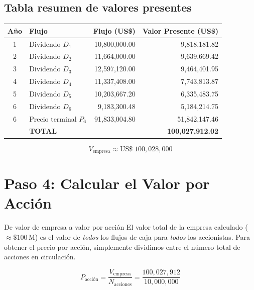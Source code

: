 \documentclass[12pt,a4paper]{article}
\begin{document}
\subsection*{Tabla resumen de valores presentes}

\begin{center}
\begin{tabular}{clrr}
\toprule
\textbf{A\~no} & \textbf{Flujo} & \textbf{Flujo (US\$)} & \textbf{Valor Presente (US\$)} \\
\midrule
1 & Dividendo $D_1$  & 10{,}800{,}000.00  &  9{,}818{,}181.82 \\
2 & Dividendo $D_2$  & 11{,}664{,}000.00  &  9{,}639{,}669.42 \\
3 & Dividendo $D_3$  & 12{,}597{,}120.00  &  9{,}464{,}401.95 \\
4 & Dividendo $D_4$  & 11{,}337{,}408.00  &  7{,}743{,}813.87 \\
5 & Dividendo $D_5$  & 10{,}203{,}667.20  &  6{,}335{,}483.75 \\
6 & Dividendo $D_6$  &  9{,}183{,}300.48  &  5{,}184{,}214.75 \\
6 & Precio terminal $P_6$ & 91{,}833{,}004.80 & 51{,}842{,}147.46 \\
\midrule
  & \textbf{TOTAL}  &                    & \textbf{100{,}027{,}912.02} \\
\bottomrule
\end{tabular}
\end{center}

\[
\boxed{V_{\text{empresa}} \approx \text{US\$}\;100{,}028{,}000}
\]

\vspace{1cm}

\section{Paso 4: Calcular el Valor por Acci\'on}

\begin{cajaintuicion}{De valor de empresa a valor por acci\'on}
El valor total de la empresa calculado ($\approx\$100\,\text{M}$) es el valor de
\emph{todos} los flujos de caja para \emph{todos} los accionistas. Para obtener el precio
por acci\'on, simplemente dividimos entre el n\'umero total de acciones en circulaci\'on.
\end{cajaintuicion}

\[
P_{\text{acci\'on}} = \frac{V_{\text{empresa}}}{N_{\text{acciones}}}
= \frac{100{,}027{,}912}{10{,}000{,}000}
\]
\end{document}
